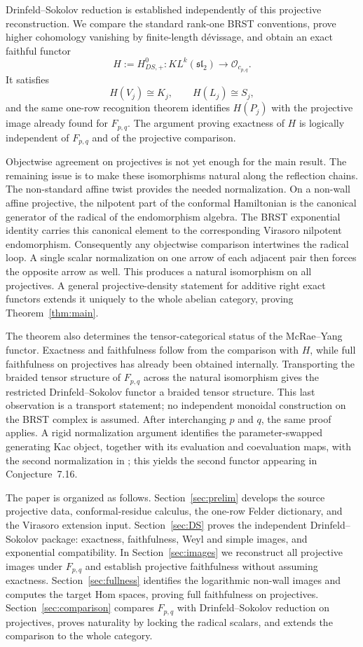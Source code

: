 \documentclass[12pt,leqno]{amsart}
\numberwithin{equation}{section}
\newcommand{\KL}{KL}
\newcommand{\Oc}{\mathcal O}
\begin{document}
Drinfeld--Sokolov reduction is established independently of this
projective reconstruction.  We compare the standard rank-one BRST
conventions, prove higher cohomology vanishing by finite-length
d\'evissage, and obtain an exact faithful functor
\[
 H:=H^0_{DS,+}:\KL^k(\mathfrak{sl}_2)\longrightarrow\Oc_{c_{p,q}}.
\]
It satisfies
\[
 H(V_j)\cong K_j,\qquad H(L_j)\cong S_j,
\]
and the same one-row recognition theorem identifies $H(P_j)$ with the
projective image already found for $F_{p,q}$.  The argument proving
exactness of $H$ is logically independent of $F_{p,q}$ and of the
projective comparison.

Objectwise agreement on projectives is not yet enough for the main
result.  The remaining issue is to make these isomorphisms natural along
the reflection chains.  The non-standard affine twist provides the needed
normalization.  On a non-wall affine projective, the nilpotent part of the
conformal Hamiltonian is the canonical generator of the radical of the
endomorphism algebra.  The BRST exponential identity carries this
canonical element to the corresponding Virasoro nilpotent endomorphism.
Consequently any objectwise comparison intertwines the radical loop.  A
single scalar normalization on one arrow of each adjacent pair then forces
the opposite arrow as well.  This produces a natural isomorphism on all
projectives.  A general projective-density statement for additive right
exact functors extends it uniquely to the whole abelian category, proving
Theorem~\ref{thm:main}.

The theorem also determines the tensor-categorical status of the
McRae--Yang functor.  Exactness and faithfulness follow from the comparison
with $H$, while full faithfulness on projectives has already been obtained
internally.  Transporting the braided tensor structure of $F_{p,q}$ across
the natural isomorphism gives the restricted Drinfeld--Sokolov functor a
braided tensor structure.  This last observation is a transport statement;
no independent monoidal construction on the BRST complex is assumed.
After interchanging $p$ and $q$, the same proof applies.  A rigid
normalization argument identifies the parameter-swapped generating Kac
object, together with its evaluation and coevaluation maps, with the second
normalization in \cite[Theorem~7.15]{McRaeYang}; this yields the second
functor appearing in Conjecture~7.16.

The paper is organized as follows.  Section~\ref{sec:prelim} develops the
source projective data, conformal-residue calculus, the one-row Felder
dictionary, and the Virasoro extension input.  Section~\ref{sec:DS}
proves the independent Drinfeld--Sokolov package: exactness, faithfulness,
Weyl and simple images, and exponential compatibility.  In
Section~\ref{sec:images} we reconstruct all projective images under
$F_{p,q}$ and establish projective faithfulness without assuming
exactness.  Section~\ref{sec:fullness} identifies the logarithmic
non-wall images and computes the target Hom spaces, proving full
faithfulness on projectives.  Section~\ref{sec:comparison} compares
$F_{p,q}$ with Drinfeld--Sokolov reduction on projectives, proves
naturality by locking the radical scalars, and extends the comparison to
the whole category.
\end{document}
